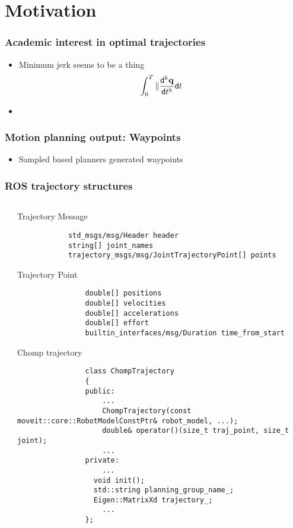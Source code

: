 \section{Motivation}

\begin{frame}[t]
	\frametitle{Academic interest in optimal trajectories}

	\begin{itemize}
		\item Minimum jerk seems to be a thing
		      \begin{equation*}
			      \int_0^T \|\frac{\mathsf{d}^{k} \mathbf{q}}{\mathsf{d} t^{k}} \mathsf{d} t
		      \end{equation*}
		\item
	\end{itemize}
\end{frame}

\begin{frame}[t]
	\frametitle{Motion planning output: Waypoints}
	\begin{itemize}
		\item Sampled based planners generated waypoints
	\end{itemize}
\end{frame}

\begin{frame}[fragile]
	\frametitle{ROS trajectory structures}
	\begin{columns}
		\begin{column}{0.5\textwidth}

		\end{column}
		\begin{column}{0.5\textwidth}
			Trajectory Message
			\begin{lstlisting}
            std_msgs/msg/Header header
            string[] joint_names
            trajectory_msgs/msg/JointTrajectoryPoint[] points
            \end{lstlisting}
			Trajectory Point
			\begin{lstlisting}
                double[] positions
                double[] velocities
                double[] accelerations
                double[] effort
                builtin_interfaces/msg/Duration time_from_start
                \end{lstlisting}
			Chomp trajectory
			\begin{lstlisting}
                class ChompTrajectory
                {
                public:
                    ...
                    ChompTrajectory(const moveit::core::RobotModelConstPtr& robot_model, ...);
                    double& operator()(size_t traj_point, size_t joint);
                    ...
                private:
                    ...
                  void init(); 
                  std::string planning_group_name_;  
                  Eigen::MatrixXd trajectory_;      
                    ...
                };
                \end{lstlisting}
		\end{column}
	\end{columns}
\end{frame}
